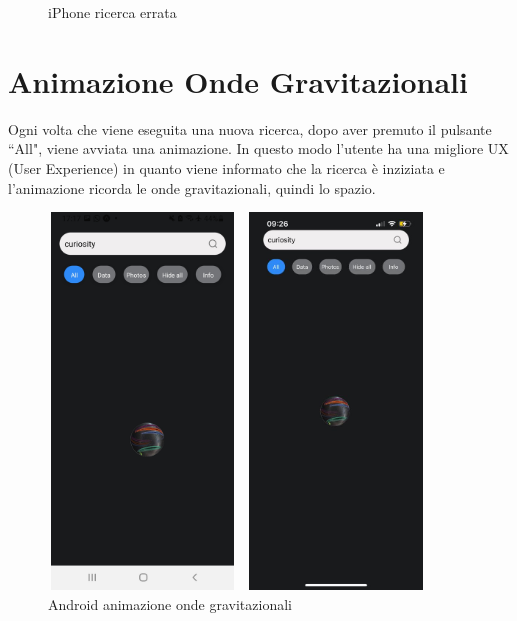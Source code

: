 \begin{figure}[h]
\begin{minipage}[h]{0.47\textwidth}
        \caption{\label{ricercaErrataIphone} iPhone ricerca errata}
    \end{minipage}
\end{figure}

\section{Animazione Onde Gravitazionali}
Ogni volta che viene eseguita una nuova ricerca, dopo aver premuto il pulsante ``All", viene avviata una animazione. In questo modo l'utente ha una migliore UX (User Experience) in quanto viene informato che la ricerca \`e inziziata e l'animazione ricorda le onde gravitazionali, quindi lo spazio.
\begin{figure}[H]
    \begin{minipage}[h]{0.47\textwidth}
        \centering
        \includegraphics[width=5cm, height=10cm]{images/immaginiAndroid/animazione.jpg}
        \caption{\label{animazioneAndroid} Android animazione onde gravitazionali}
    \end{minipage}
    \hfill
    \begin{minipage}[h]{0.47\textwidth}
        \centering
        \includegraphics[width=5cm, height=10cm]{images/immaginiPhone/animazione.jpeg}

\end{minipage}
\end{figure}
